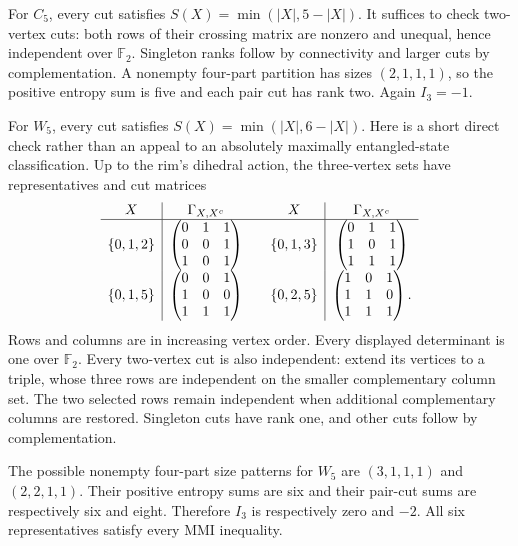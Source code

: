 \documentclass[11pt,letterpaper]{article}
\newcommand{\F}{\mathbb F_2}
\newcommand{\Ithree}{I_3}
\begin{document}
For $C_5$, every cut satisfies $S(X)=\min(|X|,5-|X|)$. It suffices to check two-vertex cuts: both rows of their crossing matrix are nonzero and unequal, hence independent over $\F$. Singleton ranks follow by connectivity and larger cuts by complementation. A nonempty four-part partition has sizes $(2,1,1,1)$, so the positive entropy sum is five and each pair cut has rank two. Again $\Ithree=-1$.

For $W_5$, every cut satisfies $S(X)=\min(|X|,6-|X|)$. Here is a short direct check rather than an appeal to an absolutely maximally entangled-state classification. Up to the rim's dihedral action, the three-vertex sets have representatives and cut matrices
\[
\begin{array}{c|c@{\qquad}c|c}
X&\Gamma_{X,X^c}&X&\Gamma_{X,X^c}\\\hline
\{0,1,2\}&\begin{pmatrix}0&1&1\\0&0&1\\1&0&1\end{pmatrix}&
\{0,1,3\}&\begin{pmatrix}0&1&1\\1&0&1\\1&1&1\end{pmatrix}\\[10pt]
\{0,1,5\}&\begin{pmatrix}0&0&1\\1&0&0\\1&1&1\end{pmatrix}&
\{0,2,5\}&\begin{pmatrix}1&0&1\\1&1&0\\1&1&1\end{pmatrix}.
\end{array}
\]
Rows and columns are in increasing vertex order. Every displayed determinant is one over $\F$. Every two-vertex cut is also independent: extend its vertices to a triple, whose three rows are independent on the smaller complementary column set. The two selected rows remain independent when additional complementary columns are restored. Singleton cuts have rank one, and other cuts follow by complementation.

The possible nonempty four-part size patterns for $W_5$ are $(3,1,1,1)$ and $(2,2,1,1)$. Their positive entropy sums are six and their pair-cut sums are respectively six and eight. Therefore $\Ithree$ is respectively zero and $-2$. All six representatives satisfy every MMI inequality.
\end{document}
